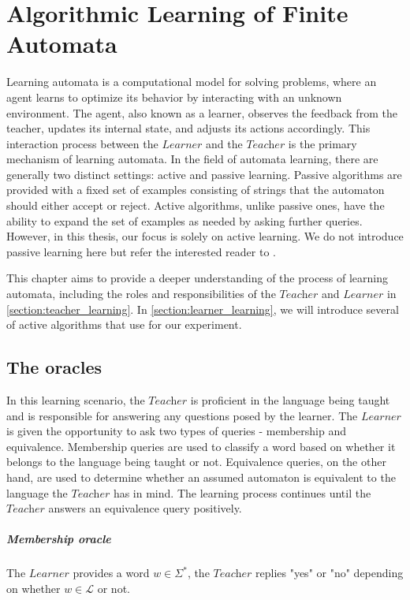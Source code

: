 \chapter{Algorithmic Learning of Finite Automata}\label{chapter:learning_algorithm}
Learning automata is a computational model for solving problems, where an agent learns 
to optimize its behavior by interacting with an unknown environment. 
The agent, also known as a learner, 
observes the feedback from the teacher, updates its internal state, and adjusts its 
actions accordingly. 
This interaction process between the $\textit{Learner}$ and the $\textit{Teacher}$ 
is the primary mechanism of learning automata.
In the field of automata learning, there are generally two distinct settings: 
active and passive learning. Passive algorithms are provided with a fixed set of 
examples consisting of strings that the automaton should either accept or reject. 
Active algorithms, unlike passive ones, have the ability to expand the set of examples as needed
by asking further queries.
However, in this thesis, our focus is solely on active learning.
We do not introduce passive learning here but refer the interested reader to \cite*{clarke2009model}.

This chapter aims to provide a deeper understanding of the process of learning automata, 
including the roles and responsibilities of the $\textit{Teacher}$ and $\textit{Learner}$ in \autoref{section:teacher_learning}. 
In \autoref{section:learner_learning}, we will introduce several of active algorithms 
that use for our experiment.
\section{The oracles}\label{section:teacher_learning}
In this learning scenario, the $\textit{Teacher}$ is proficient in the language being taught 
and is responsible for answering any questions posed by the learner. The $\textit{Learner}$ 
is given the opportunity to ask two types of queries - membership and equivalence. 
Membership queries are used to classify a word based on whether it belongs to the 
language being taught or not. Equivalence queries, on the other hand, are used to 
determine whether an assumed automaton is equivalent to the language the $\textit{Teacher}$ has 
in mind. The learning process continues until the $\textit{Teacher}$ answers an equivalence query 
positively.
\paragraph*{Membership oracle} 
The $\textit{Learner}$ provides a word $w \in \Sigma^{*}$, the $\textit{Teacher}$ replies "yes" 
or "no" depending on whether $w \in \mathcal{L}$ or not.
